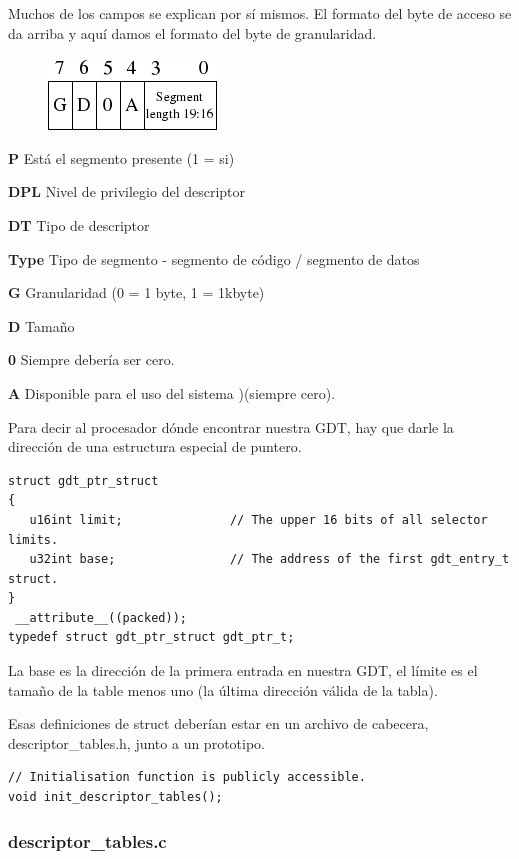 \documentclass{report}
\begin{document}
Muchos de los campos se explican por sí mismos. El formato del byte de acceso se da arriba y aquí damos el formato del byte de granularidad.

\begin{figure}[htb]
\centering
\includegraphics[scale=0.5]{gdt_idt_gdt_format_1.png}
\end{figure}

\textbf{P} Está el segmento presente (1 = si)

\textbf{DPL} Nivel de privilegio del descriptor

\textbf{DT} Tipo de descriptor

\textbf{Type} Tipo de segmento - segmento de código / segmento de datos

\textbf{G} Granularidad (0 = 1 byte, 1 = 1kbyte)

\textbf{D} Tamaño

\textbf{0} Siempre debería ser cero.

\textbf{A} Disponible para el uso del sistema )(siempre cero).

Para decir al procesador dónde encontrar nuestra GDT, hay que darle la dirección de una estructura especial de puntero.

\begin{lstlisting}
struct gdt_ptr_struct
{
   u16int limit;               // The upper 16 bits of all selector limits.
   u32int base;                // The address of the first gdt_entry_t struct.
}
 __attribute__((packed));
typedef struct gdt_ptr_struct gdt_ptr_t;
\end{lstlisting}

La base es la dirección de la primera entrada en nuestra GDT, el límite es el tamaño de la table menos uno (la última dirección válida de la tabla).

Esas definiciones de struct deberían estar en un archivo de cabecera, descriptor\_tables.h, junto a un prototipo.

\begin{lstlisting}
// Initialisation function is publicly accessible.
void init_descriptor_tables();
\end{lstlisting}

\subsubsection{descriptor\_tables.c}
\end{document}
